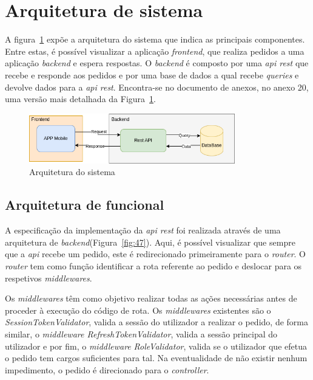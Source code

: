 \section{Arquitetura de sistema}
A figura~\ref{fig:46} expõe a arquitetura do sistema que indica as principais componentes. Entre estas, é possível visualizar a aplicação \textit{frontend}, que realiza pedidos a uma aplicação \textit{backend} e espera respostas. O \textit{backend} é composto por uma \textit{\textit{\acrshort{api}} rest} que recebe e responde aos pedidos e por uma base de dados a qual recebe \textit{queries} e devolve dados para a \textit{\textit{\acrshort{api}} rest}. Encontra-se no documento de anexos, no anexo 20, uma versão mais detalhada da Figura~\ref*{fig:46}.

\begin{figure}[htb]
  \centering
  
  \includegraphics[width=0.8\textwidth]{images/Arquiteturas/arquitetura_de_solucao.png}
  \caption{Arquitetura do sistema}
  \label{fig:46}
\end{figure}

\newpage

\subsection{Arquitetura de funcional}
A especificação da implementação da \textit{\textit{\acrshort{api}} rest} foi realizada através de uma arquitetura de \textit{backend}(Figura~\ref{fig:47}). Aqui, é possível visualizar que sempre que a \textit{\acrshort{api}} recebe um pedido, este é redirecionado primeiramente para o \textit{router}. O \textit{router} tem como função identificar a rota referente ao pedido e deslocar para os respetivos \textit{middlewares}. 

Os \textit{middlewares} têm como objetivo realizar todas as ações necessárias antes de proceder à execução do código de rota. Os \textit{middlewares} existentes são o \textit{SessionTokenValidator}, valida a sessão do utilizador a realizar o pedido, de forma similar, o \textit{middleware RefreshTokenValidator}, valida a sessão principal do utilizador e por fim, o \textit{middleware} \textit{RoleValidator}, valida se o utilizador que efetua o pedido tem cargos suficientes para tal. Na eventualidade de não existir nenhum impedimento, o pedido é direcionado para o \textit{controller}.

